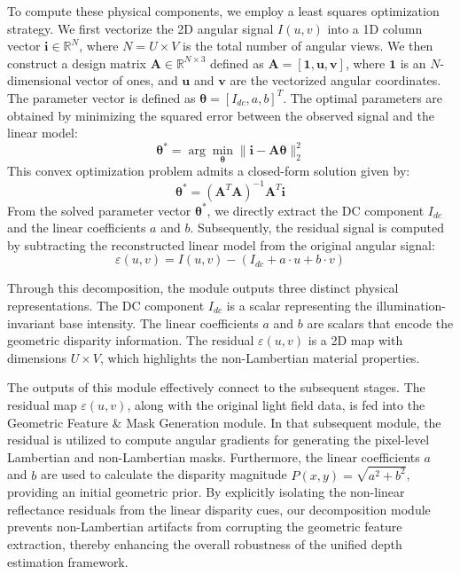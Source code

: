 \documentclass[lettersize,journal]{IEEEtran}
\begin{document}
To compute these physical components, we employ a least squares optimization strategy. We first vectorize the 2D angular signal $I(u,v)$ into a 1D column vector $\mathbf{i} \in \mathbb{R}^{N}$, where $N = U \times V$ is the total number of angular views. We then construct a design matrix $\mathbf{A} \in \mathbb{R}^{N \times 3}$ defined as $\mathbf{A} = [\mathbf{1}, \mathbf{u}, \mathbf{v}]$, where $\mathbf{1}$ is an $N$-dimensional vector of ones, and $\mathbf{u}$ and $\mathbf{v}$ are the vectorized angular coordinates. The parameter vector is defined as $\mathbf{\theta} = [I_{dc}, a, b]^T$. The optimal parameters are obtained by minimizing the squared error between the observed signal and the linear model:
\begin{equation} \label{eq:ch3_2}
\mathbf{\theta}^* = \arg\min_{\mathbf{\theta}} \|\mathbf{i} - \mathbf{A}\mathbf{\theta}\|_2^2
\end{equation}
This convex optimization problem admits a closed-form solution given by:
\begin{equation} \label{eq:ch3_3}
\mathbf{\theta}^* = (\mathbf{A}^T\mathbf{A})^{-1}\mathbf{A}^T\mathbf{i}
\end{equation}
From the solved parameter vector $\mathbf{\theta}^*$, we directly extract the DC component $I_{dc}$ and the linear coefficients $a$ and $b$. Subsequently, the residual signal is computed by subtracting the reconstructed linear model from the original angular signal:
\begin{equation} \label{eq:ch3_4}
\varepsilon(u,v) = I(u,v) - (I_{dc} + a \cdot u + b \cdot v)
\end{equation}

Through this decomposition, the module outputs three distinct physical representations. The DC component $I_{dc}$ is a scalar representing the illumination-invariant base intensity. The linear coefficients $a$ and $b$ are scalars that encode the geometric disparity information. The residual $\varepsilon(u,v)$ is a 2D map with dimensions $U \times V$, which highlights the non-Lambertian material properties. 

The outputs of this module effectively connect to the subsequent stages. The residual map $\varepsilon(u,v)$, along with the original light field data, is fed into the Geometric Feature \& Mask Generation module. In that subsequent module, the residual is utilized to compute angular gradients for generating the pixel-level Lambertian and non-Lambertian masks. Furthermore, the linear coefficients $a$ and $b$ are used to calculate the disparity magnitude $P(x,y) = \sqrt{a^2+b^2}$, providing an initial geometric prior. By explicitly isolating the non-linear reflectance residuals from the linear disparity cues, our decomposition module prevents non-Lambertian artifacts from corrupting the geometric feature extraction, thereby enhancing the overall robustness of the unified depth estimation framework.
\end{document}

